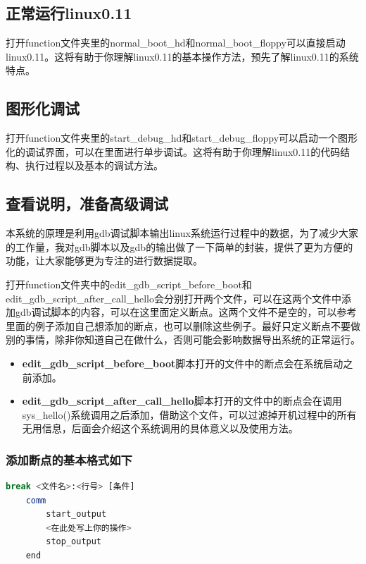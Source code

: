 \documentclass[]{report}
\begin{document}
\subsection{正常运行linux0.11}

打开function文件夹里的normal\_boot\_hd和normal\_boot\_floppy可以直接启动linux0.11。这将有助于你理解linux0.11的基本操作方法，预先了解linux0.11的系统特点。

\subsection{图形化调试}

打开function文件夹里的start\_debug\_hd和start\_debug\_floppy可以启动一个图形化的调试界面，可以在里面进行单步调试。这将有助于你理解linux0.11的代码结构、执行过程以及基本的调试方法。

\subsection{查看说明，准备高级调试}

本系统的原理是利用gdb调试脚本输出linux系统运行过程中的数据，为了减少大家的工作量，我对gdb脚本以及gdb的输出做了一下简单的封装，提供了更为方便的功能，让大家能够更为专注的进行数据提取。

打开function文件夹中的edit\_gdb\_script\_before\_boot和\\edit\_gdb\_script\_after\_call\_hello会分别打开两个文件，可以在这两个文件中添加gdb调试脚本的内容，可以在这里面定义断点。这两个文件不是空的，可以参考里面的例子添加自己想添加的断点，也可以删除这些例子。最好只定义断点不要做别的事情，除非你知道自己在做什么，否则可能会影响数据导出系统的正常运行。

\begin{itemize}
\item \textbf{edit\_gdb\_script\_before\_boot}\quad 脚本打开的文件中的断点会在系统启动之前添加。
\item \textbf{edit\_gdb\_script\_after\_call\_hello}\quad 脚本打开的文件中的断点会在调用sys\_hello()系统调用之后添加，借助这个文件，可以过滤掉开机过程中的所有无用信息，后面会介绍这个系统调用的具体意义以及使用方法。
\end{itemize}

\subsubsection{添加断点的基本格式如下}

\begin{lstlisting}[caption={添加断点},language=Bash,morekeywords={break,comm,end}]
break <文件名>:<行号> [条件]
    comm
        start_output
        <在此处写上你的操作>
        stop_output
    end
\end{lstlisting}
\end{document}
